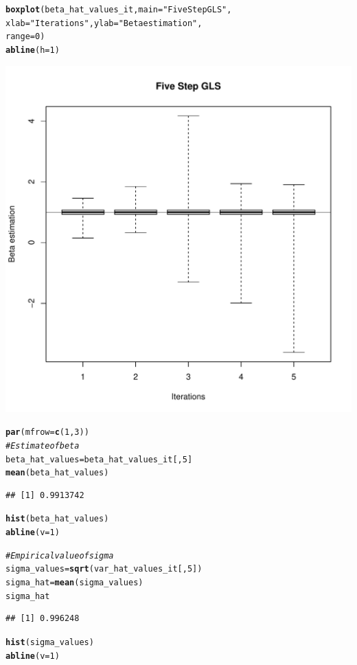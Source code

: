 \documentclass[11pt]{article}\usepackage[]{graphicx}\usepackage[]{color}
\makeatletter
\def\maxwidth{ %
  \ifdim\Gin@nat@width>\linewidth
    \linewidth
  \else
    \Gin@nat@width
  \fi
}
\newcommand{\hlnum}[1]{\textcolor[rgb]{0.686,0.059,0.569}{#1}}%
\newcommand{\hlstr}[1]{\textcolor[rgb]{0.192,0.494,0.8}{#1}}%
\newcommand{\hlcom}[1]{\textcolor[rgb]{0.678,0.584,0.686}{\textit{#1}}}%
\newcommand{\hlstd}[1]{\textcolor[rgb]{0.345,0.345,0.345}{#1}}%
\newcommand{\hlkwb}[1]{\textcolor[rgb]{0.69,0.353,0.396}{#1}}%
\newcommand{\hlkwc}[1]{\textcolor[rgb]{0.333,0.667,0.333}{#1}}%
\newcommand{\hlkwd}[1]{\textcolor[rgb]{0.737,0.353,0.396}{\textbf{#1}}}%
\newenvironment{kframe}{%
 \def\at@end@of@kframe{}%
 \ifinner\ifhmode%
  \def\at@end@of@kframe{\end{minipage}}%
  \begin{minipage}{\columnwidth}%
 \fi\fi%
 \def\FrameCommand##1{\hskip\@totalleftmargin \hskip-\fboxsep
 \colorbox{shadecolor}{##1}\hskip-\fboxsep
     \hskip-\linewidth \hskip-\@totalleftmargin \hskip\columnwidth}%
 \MakeFramed {\advance\hsize-\width
   \@totalleftmargin\z@ \linewidth\hsize
   \@setminipage}}%
 {\par\unskip\endMakeFramed%
 \at@end@of@kframe}
\newenvironment{knitrout}{}{} %
\makeatother
\begin{document}
\begin{knitrout}
\begin{kframe}
\begin{alltt}
\hlkwd{boxplot}\hlstd{(beta_hat_values_it,} \hlkwc{main} \hlstd{=} \hlstr{"Five Step GLS"}\hlstd{,}
        \hlkwc{xlab} \hlstd{=} \hlstr{"Iterations"}\hlstd{,} \hlkwc{ylab} \hlstd{=} \hlstr{"Beta estimation"}\hlstd{,}
        \hlkwc{range}\hlstd{=}\hlnum{0}\hlstd{)}
\hlkwd{abline}\hlstd{(}\hlkwc{h}\hlstd{=}\hlnum{1}\hlstd{)}
\end{alltt}
\end{kframe}
\includegraphics[width=\maxwidth]{figure/unnamed-chunk-6-1} 
\begin{kframe}\begin{alltt}
\hlkwd{par}\hlstd{(}\hlkwc{mfrow} \hlstd{=} \hlkwd{c}\hlstd{(}\hlnum{1}\hlstd{,}\hlnum{3}\hlstd{))}
\hlcom{# Estimate of beta}
\hlstd{beta_hat_values} \hlkwb{=} \hlstd{beta_hat_values_it[,}\hlnum{5}\hlstd{]}
\hlkwd{mean}\hlstd{(beta_hat_values)}
\end{alltt}
\begin{verbatim}
## [1] 0.9913742
\end{verbatim}
\begin{alltt}
\hlkwd{hist}\hlstd{(beta_hat_values)}
\hlkwd{abline}\hlstd{(}\hlkwc{v} \hlstd{=} \hlnum{1}\hlstd{)}

\hlcom{# Empirical value of sigma}
\hlstd{sigma_values} \hlkwb{=} \hlkwd{sqrt}\hlstd{(var_hat_values_it[,}\hlnum{5}\hlstd{])}
\hlstd{sigma_hat} \hlkwb{=} \hlkwd{mean}\hlstd{(sigma_values)}
\hlstd{sigma_hat}
\end{alltt}
\begin{verbatim}
## [1] 0.996248
\end{verbatim}
\begin{alltt}
\hlkwd{hist}\hlstd{(sigma_values)}
\hlkwd{abline}\hlstd{(}\hlkwc{v} \hlstd{=} \hlnum{1}\hlstd{)}


\end{alltt}
\end{kframe}
\end{knitrout}
\end{document}
